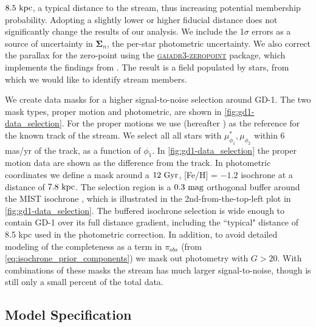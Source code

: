 \documentclass[twocolumn]{aastex631}
\newcommand{\code}[1]{\textsc{#1}}
\newcommand{\stream}[1]{#1}
\newcommand{\mbs}[1]{\boldsymbol{#1}}
\newcommand{\mcal}[1]{\mathcal{#1}}
\newcommand{\prior}{\mcal{\pi}}
\begin{document}
        $8.5 \ \rm{kpc}$, a typical distance to the stream, thus increasing
        potential membership probability. Adopting a slightly lower or higher
        fiducial distance does not significantly change the results of our
        analysis. We include the 1$\sigma$ errors as a source of uncertainty in
        $\mbs{\Sigma}_n$, the per-star photometric uncertainty.  We also correct
        the parallax for the zero-point using the
        \href{https://pypi.org/project/gaiadr3-zeropoint/}{\code{gaiadr3-zeropoint}}
        package, which implements the findings from \cite{Lindegren+2021}.  The
        result is a field populated by 
        stars, from which we would like to identify stream members.

        We create data masks for a higher signal-to-noise selection around
        \stream{GD-1}.  The two mask types, proper motion and photometric, are
        shown in \autoref{fig:gd1-data_selection}. For the proper motions we use
        \citet{Ibata+2021} (hereafter ) as the reference
        for the known track of the stream. We select all all stars with
        $\mu_{\phi_1}^*, \mu_{\phi_2}$ within 6 mas/yr of the track, as a
        function of $\phi_1$. In \autoref{fig:gd1-data_selection} the proper
        motion data are shown as the difference from the 
        track.  In photometric coordinates we define a mask around a $12 \
        \rm{Gyr}$, [Fe/H] = $-1.2$ isochrone at a distance of $7.8 \ \rm{kpc}$.
        The selection region is a $0.3 \ \rm{mag}$ orthogonal buffer around the
        MIST isochrone \citep[using][]{brutus}, which is illustrated in the
        2nd-from-the-top-left plot in \autoref{fig:gd1-data_selection}. The
        buffered isochrone selection is wide enough to contain \stream{GD-1}
        over its full distance gradient, including the ``typical" distance of
        8.5 kpc used in the photometric correction.  In addition, to avoid
        detailed modeling of the completeness as a term in $\prior_{obs}$ (from
        \autoref{eq:isochrone_prior_components}) we mask out photometry with $G
        > 20$.  With combinations of these masks the stream has much larger
        signal-to-noise, though is still only a small percent of the total data.


    \subsection{Model Specification}\label{sub:results_gd1:model}
\end{document}
